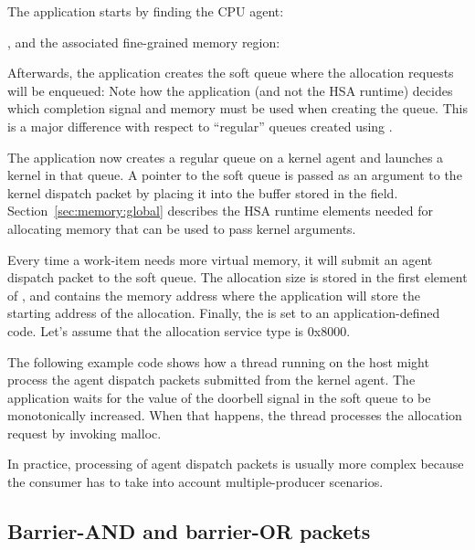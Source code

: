 \documentclass[oneside]{book}
\begin{document}
The application starts by finding the CPU agent:

, and the associated fine-grained memory region:

Afterwards, the application creates the soft queue where the allocation requests
will be enqueued:  Note how
the application (and not the HSA runtime) decides which completion signal and
memory must be used when creating the queue. This is a major difference with
respect to ``regular'' queues created using .

The application now creates a regular queue on a kernel agent and launches a
kernel in that queue. A pointer to the soft queue is passed as an argument to
the kernel dispatch packet by placing it into the buffer stored in the
field. Section~\ref{sec:memory:global} describes the HSA runtime elements needed
for allocating memory that can be used to pass kernel arguments.

Every time a work-item needs more virtual memory, it will submit an agent
dispatch packet to the soft queue. The allocation size is stored in the first
element of , and
 contains the memory address
where the application will store the starting address of the allocation.
Finally, the  is set to an
application-defined code. Let's assume that the allocation service type is
0x8000.

The following example code shows how a thread running on the host might process
the agent dispatch packets submitted from the kernel agent. The application
waits for the value of the doorbell signal in the soft queue to be monotonically
increased. When that happens, the thread processes the allocation request by
invoking malloc.


In practice, processing of agent dispatch packets is usually more complex
because the consumer has to take into account multiple-producer scenarios.

\subsection{Barrier-AND and barrier-OR packets}\label{barrier-packet}
\end{document}
